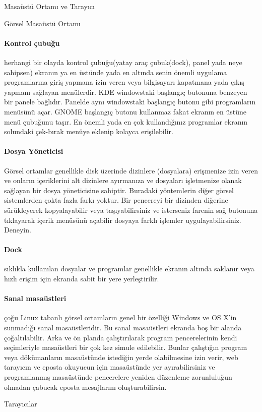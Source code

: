 \begin{section}{Masaüstü Ortamı ve Tarayıcı}
\begin{subsection}{Görsel Masaüstü Ortamı}
\paragraph{Kontrol çubuğu}{ herhangi bir olayda kontrol çubuğu(yatay araç çubuk(dock), panel yada neye sahipsen) ekranın ya en üstünde yada en altında senin önemli uygulama programlarına giriş yapmana izin veren veya bilgisayarı kapatmana yada çıkış yapmanı sağlayan menülerdir. KDE windowstaki başlangıç butonuna benzeyen bir panele bağlıdır. Panelde aynı windowstaki başlangıç butonu gibi programların menüsünü açar. GNOME başlangıç butonu kullanmaz fakat ekranın en üstüne menü çubuğunu taşır. En önemli yada en çok kullandığınız programlar ekranın solundaki çek-bırak menüye eklenip kolayca erişilebilir.}
\paragraph{Dosya Yöneticisi}{ Görsel ortamlar genellikle disk üzerinde dizinlere (dosyalara) erişmenize izin veren ve onların içeriklerini alt dizinlere ayırmanıza ve dosyaları işletmenize olanak sağlayan bir dosya yöneticisine sahiptir. Buradaki yöntemlerin diğer görsel sistemlerden çokta fazla farkı yoktur. Bir pencereyi bir dizinden diğerine sürükleyerek kopyalayabilir veya taşıyabilirsiniz ve isterseniz farenin sağ butonuna tıklayarak içerik menüsünü açabilir dosyaya farklı işlemler uygulayabilirsiniz. Deneyin.}
\paragraph{Dock}{ sıklıkla kullanılan dosyalar ve programlar genellikle ekranın altında saklanır veya hızlı erişim için ekranda sabit bir yere yerleştirilir. }
\paragraph{Sanal masaüstleri}{ çoğu Linux tabanlı görsel ortamların genel bir özelliği Windows ve OS X’in sunmadığı sanal masaüstleridir. Bu sanal masaüstleri ekranda boş bir alanda çoğaltılabilir. Arka ve ön planda çalıştırılarak program pencerelerinin kendi seçimleriyle masaüstleri bir çok kez simule edilebilir. Bunlar çalıştığın program veya dökümanların masaüstünde istediğin yerde olabilmesine izin verir, web tarayıcın ve eposta okuyucun için masaüstünde yer ayırabilirsiniz ve programlanmış masaüstünde pencerelere yeniden düzenleme zorunluluğun olmadan çabucak eposta mesajlarını oluşturabilirsin.}
\end{subsection}
\begin{subsection}{Tarayıcılar}


\end{subsection}
\end{section}

